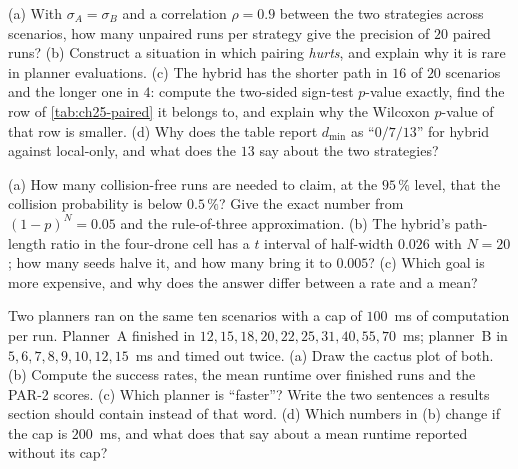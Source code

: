 \begin{exercise}[\difficulty{2}]
\label{exr:ch25-pairing}
(a) With $\sigma_A = \sigma_B$ and a correlation $\rho = 0.9$ between the
two strategies across scenarios, how many unpaired runs per strategy give
the precision of $20$ paired runs? (b) Construct a situation in which
pairing \emph{hurts}, and explain why it is rare in planner evaluations.
(c) The hybrid has the shorter path in $16$ of $20$ scenarios and the longer
one in $4$: compute the two-sided sign-test $p$-value exactly, find the row
of \cref{tab:ch25-paired} it belongs to, and explain why the Wilcoxon
$p$-value of that row is smaller. (d) Why does the table report $d_{\min}$ as
``$0 / 7 / 13$'' for hybrid against local-only, and what does the $13$ say
about the two strategies?
\end{exercise}

\begin{exercise}[\difficulty{1}]
\label{exr:ch25-runs}
(a) How many collision-free runs are needed to claim, at the $95\,\%$
level, that the collision probability is below $0.5\,\%$? Give the exact
number from $(1-p)^N = 0.05$ and the rule-of-three approximation. (b) The
hybrid's path-length ratio in the four-drone cell has a $t$ interval of
half-width $0.026$ with $N = 20$; how many seeds halve it, and how many
bring it to $0.005$? (c) Which goal is more expensive, and why does the
answer differ between a rate and a mean?
\end{exercise}

\begin{exercise}[\difficulty{2}]
\label{exr:ch25-cactus}
Two planners ran on the same ten scenarios with a cap of $100$~ms of
computation per run. Planner~A finished in $12, 15, 18, 20, 22, 25, 31, 40,
55, 70$~ms; planner~B in $5, 6, 7, 8, 9, 10, 12, 15$~ms and timed out twice.
(a) Draw the cactus plot of both. (b) Compute the success rates, the mean
runtime over finished runs and the PAR-2 scores. (c) Which planner is
``faster''? Write the two sentences a results section should contain
instead of that word. (d) Which numbers in (b) change if the cap is
$200$~ms, and what does that say about a mean runtime reported without its
cap?
\end{exercise}

